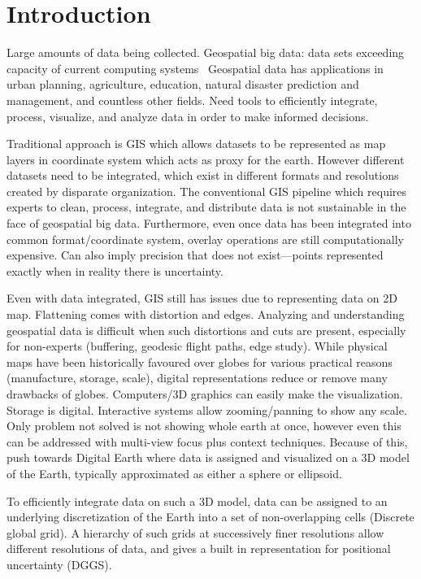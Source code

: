 \chapter{Introduction}
Large amounts of data being collected. Geospatial big data: data sets exceeding capacity of current computing systems~\cite{lee2015geospatial} Geospatial data has applications in urban planning, agriculture, education, natural disaster prediction and management, and countless other fields. Need tools to efficiently integrate, process, visualize, and analyze data in order to make informed decisions.

Traditional approach is GIS which allows datasets to be represented as map layers in coordinate system which acts as proxy for the earth. However different datasets need to be integrated, which exist in different formats and resolutions created by disparate organization. The conventional GIS pipeline which requires experts to clean, process, integrate, and distribute data is not sustainable in the face of geospatial big data. Furthermore, even once data has been integrated into common format/coordinate system, overlay operations are still computationally expensive. Can also imply precision that does not exist---points represented exactly when in reality there is uncertainty. 

Even with data integrated, GIS still has issues due to representing data on 2D map. Flattening comes with distortion and edges. Analyzing and understanding geospatial data is difficult when such distortions and cuts are present, especially for non-experts (buffering, geodesic flight paths, edge study). While physical maps have been historically favoured over globes for various practical reasons (manufacture, storage, scale), digital representations reduce or remove many drawbacks of globes. Computers/3D graphics can easily make the visualization. Storage is digital. Interactive systems allow zooming/panning to show any scale. Only problem not solved is not showing whole earth at once, however even this can be addressed with multi-view focus plus context techniques. Because of this, push towards Digital Earth where data is assigned and visualized on a 3D model of the Earth, typically approximated as either a sphere or ellipsoid.

To efficiently integrate data on such a 3D model, data can be assigned to an underlying discretization of the Earth into a set of non-overlapping cells (Discrete global grid). A hierarchy of such grids at successively finer resolutions allow different resolutions of data, and gives a built in representation for positional uncertainty (DGGS). 

